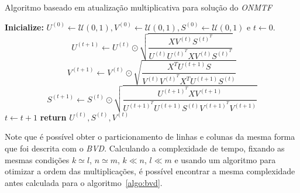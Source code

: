 \documentclass[
    12pt,                %
    oneside,            %
    a4paper,            %
    english,            %
    brazil                %
    ]{abntex2ppgsi}
\begin{document}

\begin{algorithm}
\caption{Algoritmo baseado em atualização multiplicativa para solução do \textit{ONMTF}}
\label{algo:onmtf}
\begin{algorithmic}[1]
\State \textbf{Inicialize:} $U^{(0)} \gets \mathcal{U}(0, 1), V^{(0)} \gets \mathcal{U}(0, 1), S^{(0)} \gets \mathcal{U}(0, 1)$ e $t \gets 0$.
\State
\begin{equation}
\label{eq:onmtf:updateU}
U^{(t+1)} \gets U^{(t)} \odot \sqrt{ \frac{ X V^{(t)} S^{(t)^T} }{ U^{(t)} U^{(t)^T} X V^{(t)} S^{(t)^T} } }
\end{equation}
\State
\begin{equation}
\label{eq:onmtf:updateV}
V^{(t+1)} \gets V^{(t)} \odot \sqrt{ \frac{ X^T U^{(t+1)} S }{ V^{(t)} V^{(t)^T} X^T U^{(t+1)} S^{(t)} } }
\end{equation}
\State
\begin{equation}
\label{eq:onmtf:updateS}
S^{(t+1)} \gets S^{(t)} \odot \sqrt{ \frac{ U^{(t+1)^T} X V^{(t+1)} }{ U^{(t+1)^T} U^{(t+1)} S^{(t)} V^{(t+1)^T} V^{(t+1)} } }
\end{equation}
\State $t \gets t + 1$
\EndWhile\label{euclidendwhile}
\State \textbf{return} $U^{(t)}, S^{(t)}, V^{(t)}$
\EndFunction
\end{algorithmic}
\end{algorithm}

Note que é possível obter o particionamento de linhas e colunas da mesma forma que foi descrita com o \textit{BVD}.
Calculando a complexidade de tempo, fixando as mesmas condições $k \simeq l$, $n \simeq m$, $k \ll n$, $l \ll m$ e usando um algoritmo para otimizar a ordem das multiplicações, é possível encontrar a mesma complexidade antes calculada para o algoritmo~\ref{algo:bvd}.

\end{document}
